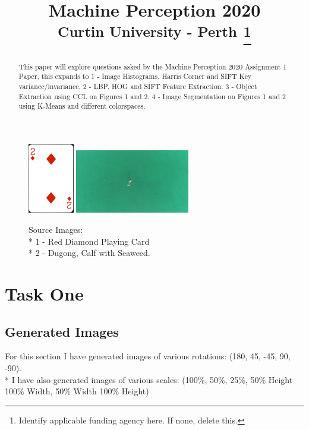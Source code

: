 \documentclass[conference]{IEEEtran}
\begin{document}
\title{Machine Perception 2020\\
{\footnotesize \textsuperscript{Curtin University - Perth}}
\thanks{Identify applicable funding agency here. If none, delete this.}
}

\author{
}

\maketitle
\begin{figure}[htbp]
    \centerline{{\includegraphics[width=20mm, scale=0.5]{./figures/diamond2.png}}
    {\includegraphics[width=50mm, scale=0.5]{./figures/Dugong.jpg}}}
    \caption{Source Images:\\*
    1 - Red Diamond Playing Card \\*
    2 - Dugong, Calf with Seaweed.}
    \label{fig}
\end{figure}
\begin{abstract}
This paper will explore questions asked by the Machine Perception 2020 Assignment 1 Paper, this expands to
1 - Image Histograms, Harris Corner and SIFT Key variance/invariance.
2 - LBP, HOG and SIFT Feature Extraction.
3 - Object Extraction using CCL on Figures 1 and 2.
4 - Image Segmentation on Figures 1 and 2 using K-Means and different colorspaces.
\end{abstract}

\section{Task One}
\subsection{Generated Images}
For this section I have generated images of various rotations: (180\degree, 45\degree, -45\degree, 90\degree, -90\degree).\\*
I have also generated images of various scales: (100\%, 50\%, 25\%, 50\% Height 100\% Width, 50\% Width 100\% Height)
\end{document}
